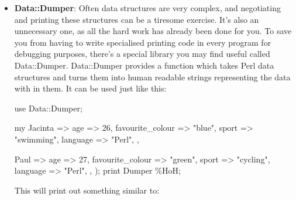 \documentclass{report}
\begin{document}
\begin{itemize}
            \bigbreak \noindent 
            We can use \$\{...\}, @\{...\} or \%\{...\} syntax to evaluate any expression and dereference the result.
        \item \textbf{Data::Dumper}: Often data structures are very complex, and negotiating and printing these structures can be a tiresome exercise. It’s also an unnecessary one, as all the hard work has already been done for you. To save you from having to write specialised printing code in every program for debugging purposes, there’s a special library you may find useful called Data::Dumper.
            \bigbreak \noindent 
            Data::Dumper provides a function which takes Perl data structures and turns them into human readable strings representing the data with in them. It can be used just like this:
            \bigbreak \noindent 
            \begin{perlcode}
            use Data::Dumper;
            \end{perlcode}
            \bigbreak \noindent 
            \begin{perlcode}
                my %
                    Jacinta => {
                        age => 26,
                        favourite_colour => "blue",
                        sport => "swimming",
                        language => "Perl",
                    },

                    Paul => {
                        age => 27,
                        favourite_colour => "green",
                        sport => "cycling",
                        language => "Perl",
                    },
                );
                print Dumper \%HoH;
            \end{perlcode}
            \bigbreak \noindent 
            This will print out something similar to:
            \bigbreak \noindent 
\end{itemize}
\end{document}

